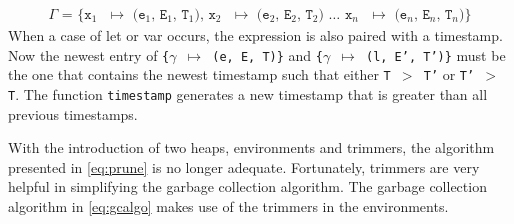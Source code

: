 \begin{align}
	\texttt{$\Gamma$ = \{x$_1$ $\mapsto$ (e$_1$, E$_1$, T$_1$), x$_2$ $\mapsto$ (e$_2$, E$_2$, T$_2$) $\dots$ x$_n$ $\mapsto$ (e$_n$, E$_n$, T$_n$)\}}\label{eq:envintrolam}
\end{align}
When a case of let or var occurs, the expression is also paired with a timestamp.
Now the newest entry of \texttt{\{$\gamma$ $\mapsto$ (e, E, T)\}} and \texttt{\{$\gamma$ $\mapsto$ (l, E', T')\}} must be the one that contains the newest timestamp such that either \texttt{T $>$ T'} or \texttt{T' $>$ T}.
The function \texttt{timestamp} generates a new timestamp that is greater than all previous timestamps.

With the introduction of two heaps, environments and trimmers, the algorithm presented in \autoref{eq:prune} is no longer adequate.
Fortunately, trimmers are very helpful in simplifying the garbage collection algorithm.
The garbage collection algorithm in \autoref{eq:gcalgo} makes use of the trimmers in the environments.
